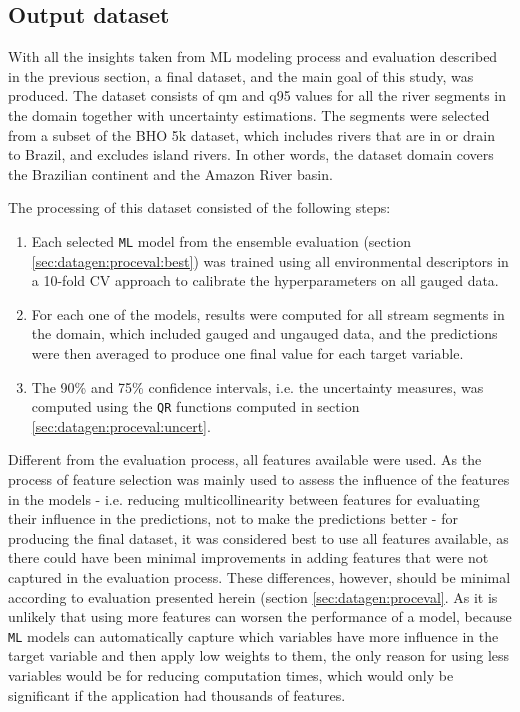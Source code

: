 \documentclass[12pt]{article}
\begin{document}
\subsection{Output dataset} \label{sec:datagen:dataset}

\par With all the insights taken from ML modeling process and evaluation described in the previous section, a final dataset, and the main goal of this study, was produced. The dataset consists of qm and q95 values for all the river segments in the domain together with uncertainty estimations. The segments were selected from a subset of the BHO 5k dataset, which includes rivers that are in or drain to Brazil, and excludes island rivers. In other words, the dataset domain covers the Brazilian continent and the Amazon River basin.

\par The processing of this dataset consisted of the following steps:

\begin{enumerate}

\item Each selected \texttt{ML} model from the ensemble evaluation (section \ref{sec:datagen:proceval:best}) was trained using all environmental descriptors in a 10-fold CV approach to calibrate the hyperparameters on all gauged data.

\item For each one of the models, results were computed for all stream segments in the domain, which included gauged and ungauged data, and the predictions were then averaged to produce one final value for each target variable.

\item The 90\% and 75\% confidence intervals, i.e. the uncertainty measures, was computed using the \texttt{QR} functions computed in section \ref{sec:datagen:proceval:uncert}.

\end{enumerate}

\par Different from the evaluation process, all features available were used. As the process of feature selection was mainly used to assess the influence of the features in the models - i.e. reducing multicollinearity between features for evaluating their influence in the predictions, not to make the predictions better - for producing the final dataset, it was considered best to use all features available, as there could have been minimal improvements in adding features that were not captured in the evaluation process. These differences, however, should be minimal according to evaluation presented herein (section \ref{sec:datagen:proceval}. As it is unlikely that using more features can worsen the performance of a model, because \texttt{ML} models can automatically capture which variables have more influence in the target variable and then apply low weights to them, the only reason for using less variables would be for reducing computation times, which would only be significant if the application had thousands of features.
\end{document}
